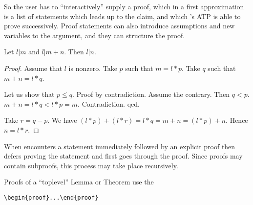 \documentclass[11pt]{article}
\begin{document}
So the user has to ``interactively'' supply a proof, which in a first
approximation is a list
of statements which leads up to the claim, and which
\Naproche{}'s ATP is able to prove successively.
Proof statements can also introduce assumptions
and new variables to the argument, and they can
structure the proof.

\begin{forthel}
\begin{lemma} Let $l | m$ and $l | m + n$. Then $l | n$.
\end{lemma}

\begin{proof}
Assume that $l$ is nonzero.
Take $p$ such that $m = l * p$. 
Take $q$ such that $m + n = l * q$.

Let us show that 
$p \leq q$.
Proof by contradiction.
Assume the contrary. Then $q < p$.
$m+n = l * q < l * p = m$.
Contradiction. qed.

Take $r = q - p$.
We have $(l * p) + (l * r) = l * q = m + n = (l * p) + n$.
Hence $n = l * r$.
\end{proof}

\end{forthel}

When \Naproche{} encounters a statement immediately followed by an 
explicit proof 
then \Naproche{} defers proving the statement and first goes through
the proof. Since proofs may contain subproofs, this process may
take place recursively.

Proofs of a ``toplevel'' Lemma or Theorem use the

\verb+\begin{proof}...\end{proof}+ 
\end{document}
